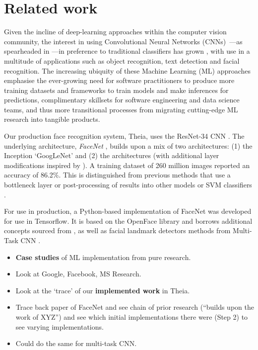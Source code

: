 \section{Related work}

Given the incline of deep-learning approaches within the computer vision community, the interest in using Convolutional Neural Networks (CNNs)~\citep{Lecun:1998hy}---as spearheaded in \citep{Krizhevsky:2012wl}---in preference to traditional classifiers has grown \citep{Girshick:2014jx, Girshick:2015vr, Li:2016uj, Ren:2017ug, He:2017ud}, with use in a multitude of applications such as object recognition, text detection and facial recognition. The increasing ubiquity of these Machine Learning (ML) approaches emphasise the ever-growing need for software practitioners  to produce more training datasets and frameworks to train models and make inferences for predictions, complimentary skillsets for software engineering and data science teams, and thus more transitional processes from migrating cutting-edge ML research into tangible products.

Our production face recognition system, Theia, uses the ResNet-34 CNN \citep{He:2016ib}. The underlying architecture, \textit{FaceNet} \citep{Schroff:2015ks}, builds upon a mix of two architectures: (1) the Inception `GoogLeNet' \citep{Szegedy:2014tb} and (2) the \citet{Zeiler:2013ws} architectures (with additional layer modifications inspired by \citep{Lin:2013wb}). A training dataset of 260 million images reported an accuracy of 86.2\%. This is distinguished from previous methods that use a bottleneck layer or post-processing of results into other models or SVM classifiers \citep{Szegedy:2014tb,Taigman:2014vs}.

For use in production, a Python-based implementation of FaceNet was developed for use in Tensorflow. It is based on the OpenFace library \citep{amos2016openface} and borrows additional concepts sourced from \citep{Parkhi:2015de,Wen:2016jx}, as well as facial landmark detectors methods from Multi-Task CNN \citep{Zhang:2016wb}.
 
\begin{itemize}
  \item \textbf{Case studies} of ML implementation from pure research.
  \item Look at Google, Facebook, MS Research.
  \item Look at the `trace' of our \textbf{implemented work} in Theia.
  \item Trace back paper of FaceNet and see chain of prior research (``builds upon the work of XYZ'') and see which initial implementations there were (Step 2) to see varying implementations.
  \item Could do the same for multi-task CNN.
\end{itemize}
